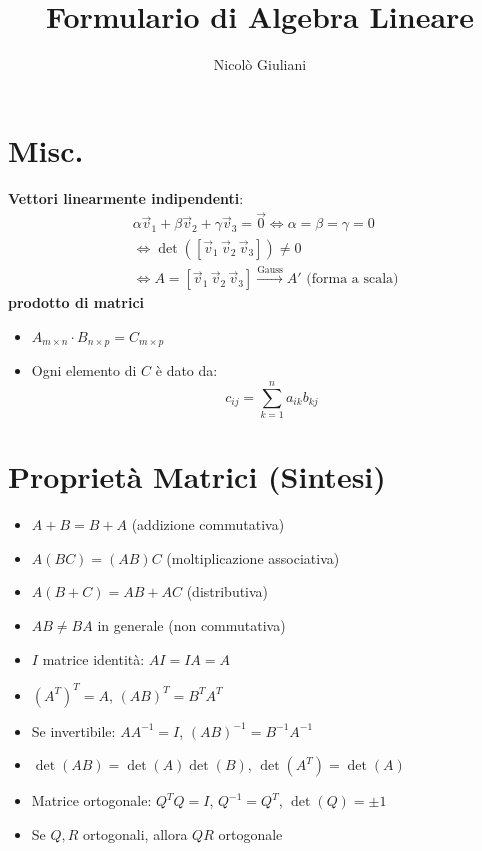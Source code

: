\documentclass[a4paper,12pt]{article}
\title{Formulario di Algebra Lineare}
\author{Nicolò Giuliani}
\date{}
\begin{document}
\section*{Misc.}
\textbf{Vettori linearmente indipendenti}:
\begin{align*}
    &\alpha \vec{v}_1 + \beta \vec{v}_2 + \gamma \vec{v}_3 = \vec{0} \iff \alpha = \beta = \gamma = 0 \\
    &\iff \det([\vec{v}_1 \, \vec{v}_2 \, \vec{v}_3]) \neq 0  \\
    &\iff A = [\vec{v}_1 \, \vec{v}_2 \, \vec{v}_3] \xrightarrow{\text{Gauss}} A' \text{ (forma a scala)}
\end{align*}
\textbf{prodotto di matrici}
\begin{itemize}
    \item \( A_{m \times n} \cdot B_{n \times p} = C_{m \times p} \)
    \item Ogni elemento di \( C \) è dato da:
    \[
    c_{ij} = \sum_{k=1}^n a_{ik} b_{kj}
    \]
\end{itemize}
\section*{Proprietà Matrici (Sintesi)}

\begin{itemize}
  \item \(A + B = B + A\) (addizione commutativa)
  \item \(A(BC) = (AB)C\) (moltiplicazione associativa)
  \item \(A(B + C) = AB + AC\) (distributiva)
  \item \(AB \neq BA\) in generale (non commutativa)
  \item \(I\) matrice identità: \(AI = IA = A\)
  \item \((A^T)^T = A\), \((AB)^T = B^T A^T\)
  \item Se invertibile: \(AA^{-1} = I\), \((AB)^{-1} = B^{-1} A^{-1}\)
  \item \(\det(AB) = \det(A) \det(B)\), \(\det(A^T) = \det(A)\)
  \item Matrice ortogonale: \(Q^T Q = I\), \(Q^{-1} = Q^T\), \(\det(Q) = \pm 1\)
  \item Se \(Q,R\) ortogonali, allora \(QR\) ortogonale
\end{itemize}
\end{document}
